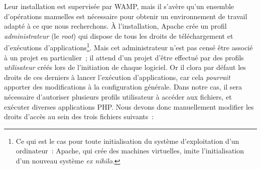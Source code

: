 \documentclass[a4paper,12pt, twoside]{book}
\begin{document}
Leur installation est supervisée par WAMP, mais il s’avère qu’un ensemble d’opérations manuelles est nécessaire pour obtenir un environnement de travail adapté à ce que nous recherchons. À l’installation, Apache crée un profil \textit{administrateur} (le \textit{root}) qui dispose de tous les droits de téléchargement et d’exécutions d’applications\footnote{Ce qui est le cas pour toute initialisation du système d’exploitation d’un ordinateur~: Apache, qui crée des machines virtuelles, imite l’initialisation d’un nouveau système \textit{ex nihilo}.}. Mais cet administrateur n’est pas censé être associé à un projet en particulier~; il attend d’un projet d’être effectué par des profils \textit{utilisateur} créés lors de l’initiation de chaque logiciel. Or il clora par défaut les droits de ces derniers à lancer l’exécution d’applications, car cela \textit{pourrait} apporter des modifications à la configuration générale. Dans notre cas, il sera nécessaire d’autoriser plusieurs profils utilisateur à accéder aux fichiers, et exécuter diverses applications PHP. Nous devons donc manuellement modifier les droits d’accès au sein des trois fichiers suivants~:
\end{document}
